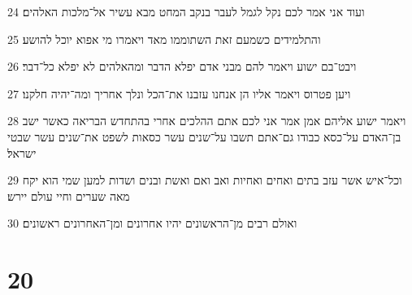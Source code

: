 \par 24 ועוד אני אמר לכם נקל לגמל לעבר בנקב המחט מבא עשיר אל־מלכות האלהים׃
\par 25 והתלמידים כשמעם זאת השתוממו מאד ויאמרו מי אפוא יוכל להושע׃
\par 26 ויבט־בם ישוע ויאמר להם מבני אדם יפלא הדבר ומהאלהים לא יפלא כל־דבר׃
\par 27 ויען פטרוס ויאמר אליו הן אנחנו עזבנו את־הכל ונלך אחריך ומה־יהיה חלקנו׃
\par 28 ויאמר ישוע אליהם אמן אמר אני לכם אתם ההלכים אחרי בהתחדש הבריאה כאשר ישב בן־האדם על־כסא כבודו גם־אתם תשבו על־שנים עשר כסאות לשפט את־שנים עשר שבטי ישראל׃
\par 29 וכל־איש אשר עזב בתים ואחים ואחיות ואב ואם ואשת ובנים ושדות למען שמי הוא יקח מאה שערים וחיי עולם יירש׃
\par 30 ואולם רבים מן־הראשונים יהיו אחרונים ומן־האחרונים ראשונים׃

\chapter{20}

